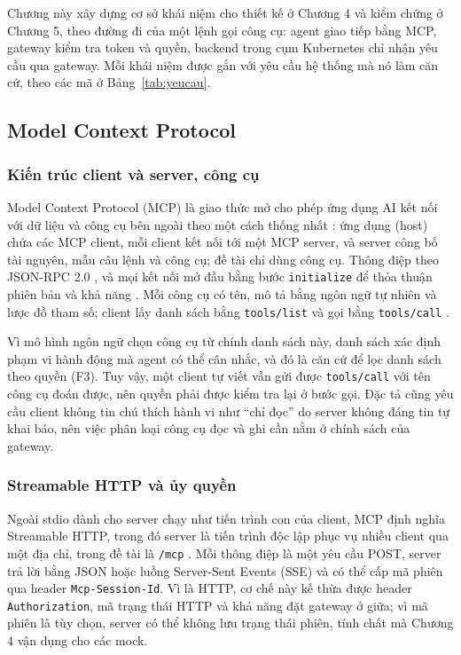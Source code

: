 
Chương này xây dựng cơ sở khái niệm cho thiết kế ở Chương 4 và kiểm chứng ở Chương 5, theo đường đi của một lệnh gọi công cụ: agent giao tiếp bằng MCP, gateway kiểm tra token và quyền, backend trong cụm Kubernetes chỉ nhận yêu cầu qua gateway. Mỗi khái niệm được gắn với yêu cầu hệ thống mà nó làm căn cứ, theo các mã ở Bảng~\ref{tab:yeucau}.

\subsection{Model Context Protocol}

\subsubsection{Kiến trúc client và server, công cụ}

Model Context Protocol (MCP) là giao thức mở cho phép ứng dụng AI kết nối với dữ liệu và công cụ bên ngoài theo một cách thống nhất \parencite{mcp_spec}: ứng dụng (host) chứa các MCP client, mỗi client kết nối tới một MCP server, và server công bố tài nguyên, mẫu câu lệnh và công cụ; đề tài chỉ dùng công cụ. Thông điệp theo JSON-RPC 2.0 \parencite{jsonrpc2}, và mọi kết nối mở đầu bằng bước \texttt{initialize} để thỏa thuận phiên bản và khả năng \parencite{mcp_lifecycle}. Mỗi công cụ có tên, mô tả bằng ngôn ngữ tự nhiên và lược đồ tham số; client lấy danh sách bằng \texttt{tools/list} và gọi bằng \texttt{tools/call} \parencite{mcp_tools}.

Vì mô hình ngôn ngữ chọn công cụ từ chính danh sách này, danh sách xác định phạm vi hành động mà agent có thể cân nhắc, và đó là căn cứ để lọc danh sách theo quyền (F3). Tuy vậy, một client tự viết vẫn gửi được \texttt{tools/call} với tên công cụ đoán được, nên quyền phải được kiểm tra lại ở bước gọi. Đặc tả cũng yêu cầu client không tin chú thích hành vi như ``chỉ đọc'' do server không đáng tin tự khai báo, nên việc phân loại công cụ đọc và ghi cần nằm ở chính sách của gateway.

\subsubsection{Streamable HTTP và ủy quyền}

Ngoài stdio dành cho server chạy như tiến trình con của client, MCP định nghĩa Streamable HTTP, trong đó server là tiến trình độc lập phục vụ nhiều client qua một địa chỉ, trong đề tài là \texttt{/mcp} \parencite{mcp_transports}. Mỗi thông điệp là một yêu cầu POST, server trả lời bằng JSON hoặc luồng Server-Sent Events (SSE) và có thể cấp mã phiên qua header \texttt{Mcp-Session-Id}. Vì là HTTP, cơ chế này kế thừa được header \texttt{Authorization}, mã trạng thái HTTP và khả năng đặt gateway ở giữa; vì mã phiên là tùy chọn, server có thể không lưu trạng thái phiên, tính chất mà Chương 4 vận dụng cho các mock.

